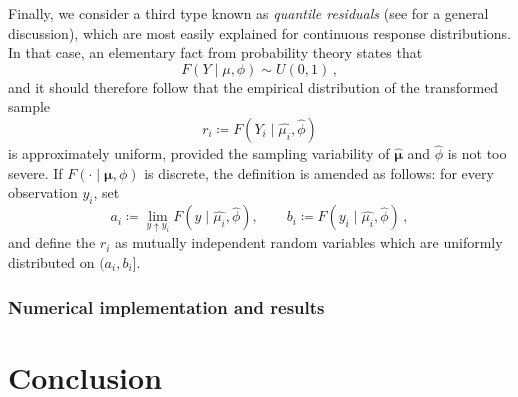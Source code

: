 \documentclass[a4paper]{book}
\begin{document}
Finally, we consider a third type known as \emph{quantile residuals} (see \cite{dunn} for a general discussion), which are most easily explained for continuous response distributions. In that case, an elementary fact from probability theory states that
\begin{equation}
  F(Y \mid \mu, \phi) \sim U(0, 1) \,,
\end{equation}
and it should therefore follow that the empirical distribution of the transformed sample
\begin{equation}
  r_i \coloneqq F(Y_i \mid \widehat{\mu_i}, \widehat{\phi})
\end{equation}
is approximately uniform, provided the sampling variability of $\bm{\widehat{\mu}}$ and $\widehat{\phi}$ is not too severe. If $F(\cdot \mid \bm{\mu}, \phi)$ is discrete, the definition is amended as follows: for every observation $y_i$, set
\begin{equation}
  a_i \coloneqq \lim_{y \uparrow y_i} F(y \mid \widehat{\mu_i}, \widehat{\phi}), \qquad b_i \coloneqq F(y_i \mid \widehat{\mu_i}, \widehat{\phi}) \,,
\end{equation}
and define the $r_i$ as mutually independent random variables which are uniformly distributed on $(a_i, b_i]$.

\subsection{Numerical implementation and results}


\backmatter%
\chapter{Conclusion}

\printbibliography%
\end{document}

